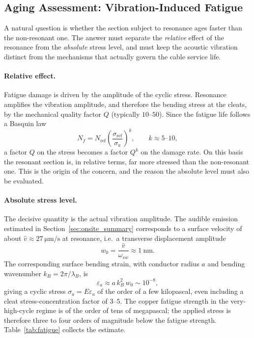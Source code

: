 \subsection{Aging Assessment: Vibration-Induced Fatigue}
\label{sec:aging}

A natural question is whether the section subject to resonance ages faster than
the non-resonant one. The answer must separate the \emph{relative} effect of the
resonance from the \emph{absolute} stress level, and must keep the acoustic
vibration distinct from the mechanisms that actually govern the cable service
life.

\paragraph{Relative effect.}
Fatigue damage is driven by the amplitude of the cyclic stress. Resonance amplifies
the vibration amplitude, and therefore the bending stress at the cleats, by the
mechanical quality factor $Q$ (typically $10$--$50$). Since the fatigue life follows
a Basquin law
\begin{equation}
	N_f = N_{\mathrm{ref}}\left(\frac{\sigma_{\mathrm{ref}}}{\sigma_a}\right)^{k},
	\qquad k\approx 5\text{--}10,
	\label{eq:basquin}
\end{equation}
a factor $Q$ on the stress becomes a factor $Q^{k}$ on the damage rate. On this
basis the resonant section is, in relative terms, far more stressed than the
non-resonant one. This is the origin of the concern, and the reason the absolute
level must also be evaluated.

\paragraph{Absolute stress level.}
The decisive quantity is the actual vibration amplitude. The audible emission
estimated in Section~\ref{sec:onsite_summary} corresponds to a surface velocity of
about $\hat v \approx \SI{27}{\micro\meter\per\second}$ at resonance, i.e.\ a
transverse displacement amplitude
\begin{equation}
	w_0 = \frac{\hat v}{\omega_{sw}} \approx \SI{1}{\nano\meter}.
\end{equation}
The corresponding surface bending strain, with conductor radius $a$ and bending
wavenumber $k_B=2\pi/\lambda_B$, is
\begin{equation}
	\varepsilon_a \approx a\,k_B^{2}\,w_0 \sim 10^{-8},
	\label{eq:strain}
\end{equation}
giving a cyclic stress $\sigma_a = E\varepsilon_a$ of the order of a few
kilopascal, even including a cleat stress-concentration factor of $3$--$5$. The
copper fatigue strength in the very-high-cycle regime is of the order of tens of
megapascal; the applied stress is therefore three to four orders of magnitude
below the fatigue strength. Table~\ref{tab:fatigue} collects the estimate.

